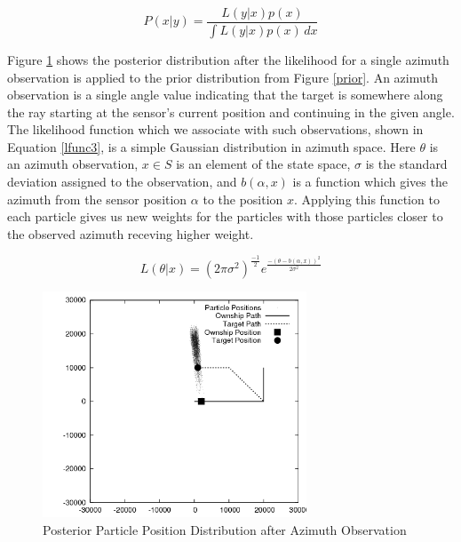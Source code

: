 \documentclass{article}
\begin{document}
\begin{equation}\label{lfunc2}
P(x|y) = \frac{L(y|x)p(x)}{\int \! L(y|x)p(x) \, dx}
\end{equation}

Figure \ref{posterior1} shows the posterior distribution after the likelihood for a single azimuth observation is applied to the prior distribution from Figure \ref{prior}. An azimuth observation is a single angle value indicating that the target is somewhere along the ray starting at the sensor's current position and continuing in the given angle. The likelihood function which we associate with such observations, shown in Equation \ref{lfunc3}, is a simple Gaussian distribution in azimuth space.\cite{bmtt} Here \(\theta\) is an azimuth observation, \(x \in S\) is an element of the state space, \(\sigma\) is the standard deviation assigned to the observation, and \(b(\alpha,x)\) is a function which gives the azimuth from the sensor position \(\alpha\) to the position \(x\). Applying this function to each particle gives us new weights for the particles with those particles closer to the observed azimuth receving higher weight.

\begin{equation}\label{lfunc3}
L(\theta|x)=(2\pi\sigma^{2})^{\frac{-1}{2}}e^{\frac{-(\theta-b(\alpha,x))^{2}}{2\sigma^{2}}}
\end{equation}

\begin{figure}
\centering
\includegraphics[width=0.7\textwidth]{data/particles_azimuth_obs.png}
\caption{Posterior Particle Position Distribution after Azimuth Observation}
\label{posterior1}
\end{figure}
\end{document}

